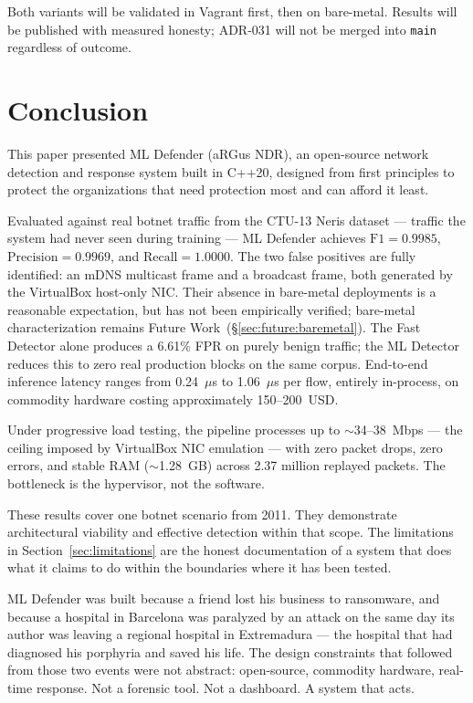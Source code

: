 \documentclass[11pt,a4paper]{article}
\begin{document}
    Both variants will be validated in Vagrant first, then on bare-metal. Results
    will be published with measured honesty; ADR-031 will not be merged into
    \texttt{main} regardless of outcome.
    \section{Conclusion}

    This paper presented ML Defender (aRGus NDR), an open-source network detection and response
    system built in C++20, designed from first principles to protect the organizations that need
    protection most and can afford it least.

    Evaluated against real botnet traffic from the CTU-13 Neris dataset --- traffic the system
    had never seen during training --- ML Defender achieves $\text{F1} = 0.9985$,
    $\text{Precision} = 0.9969$, and $\text{Recall} = 1.0000$. The two false positives are fully
    identified: an mDNS multicast frame and a broadcast frame, both generated by the VirtualBox host-only NIC.
    Their absence in bare-metal deployments is a reasonable expectation, but has not been empirically verified;
    bare-metal characterization remains Future Work~(\S\ref{sec:future:baremetal}). The
    Fast Detector alone produces a 6.61\% FPR on purely benign traffic; the ML Detector reduces
    this to zero real production blocks on the same corpus. End-to-end inference latency ranges
    from 0.24~$\mu$s to 1.06~$\mu$s per flow, entirely in-process, on commodity hardware costing
    approximately 150--200~USD.

    Under progressive load testing, the pipeline processes up to ${\sim}$34--38~Mbps --- the
    ceiling imposed by VirtualBox NIC emulation --- with zero packet drops, zero errors, and
    stable RAM (${\sim}$1.28~GB) across 2.37 million replayed packets. The bottleneck is the
    hypervisor, not the software.

    These results cover one botnet scenario from 2011. They demonstrate architectural viability
    and effective detection within that scope. The limitations in Section~\ref{sec:limitations}
    are the honest documentation of a system that does what it claims to do within the boundaries
    where it has been tested.

    ML Defender was built because a friend lost his business to ransomware, and because a
    hospital in Barcelona was paralyzed by an attack on the same day its author was leaving a
    regional hospital in Extremadura --- the hospital that had diagnosed his porphyria and saved
    his life. The design constraints that followed from those two events were not abstract:
    open-source, commodity hardware, real-time response. Not a forensic tool. Not a dashboard. A
    system that acts.
\end{document}
